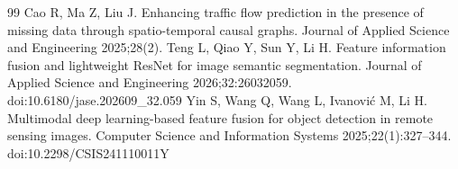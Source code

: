 \documentclass[a4paper,fleqn]{cas-dc}
\begin{document}
\begin{thebibliography}{99}
 Cao R, Ma Z, Liu J. Enhancing traffic flow prediction in the presence of missing data through spatio-temporal causal graphs. Journal of Applied Science and Engineering 2025;28(2).
 Teng L, Qiao Y, Sun Y, Li H. Feature information fusion and lightweight ResNet for image semantic segmentation. Journal of Applied Science and Engineering 2026;32:26032059. doi:10.6180/jase.202609\_32.059
 Yin S, Wang Q, Wang L, Ivanovi\'c M, Li H. Multimodal deep learning-based feature fusion for object detection in remote sensing images. Computer Science and Information Systems 2025;22(1):327--344. doi:10.2298/CSIS241110011Y
\end{thebibliography}
\end{document}
